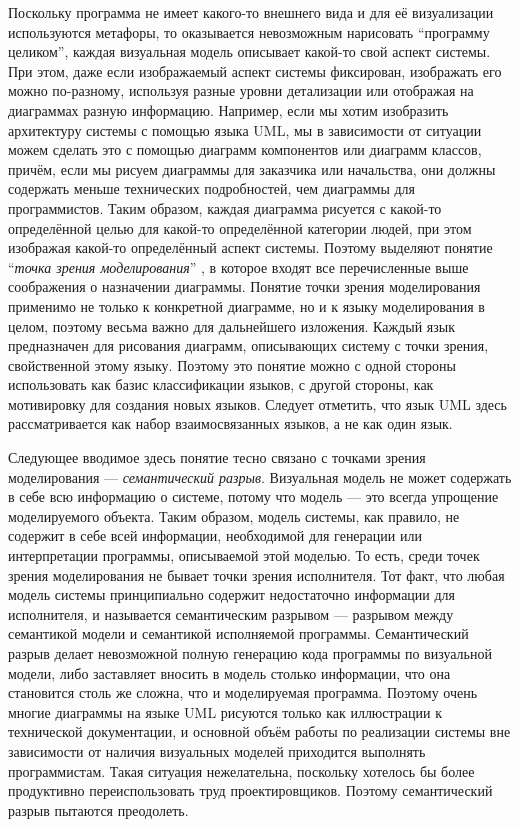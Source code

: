 Поскольку программа не имеет какого-то внешнего вида и для её визуализации 
используются метафоры, то оказывается невозможным нарисовать 
"`программу целиком"', каждая визуальная модель описывает какой-то свой аспект 
системы. При этом, даже если изображаемый аспект системы фиксирован, изображать 
его можно по-разному, используя разные уровни детализации или отображая на 
диаграммах разную информацию. Например, если мы хотим изобразить архитектуру 
системы с помощью языка \ac{UML}, мы в зависимости от ситуации можем сделать это с 
помощью диаграмм компонентов или диаграмм классов, причём, если мы рисуем 
диаграммы для заказчика или начальства, они должны содержать меньше технических 
подробностей, чем диаграммы для программистов. Таким образом, каждая диаграмма 
рисуется с какой-то определённой целью для какой-то определённой категории 
людей, при этом изображая какой-то определённый аспект системы. Поэтому выделяют 
понятие "`\textit{точка зрения моделирования}"'%
, в которое входят все перечисленные выше 
соображения о назначении диаграммы. Понятие точки зрения моделирования применимо 
не только к конкретной диаграмме, но и к языку моделирования в целом, поэтому 
весьма важно для дальнейшего изложения. Каждый язык предназначен для рисования 
диаграмм, описывающих систему с точки зрения, свойственной этому языку. 
Поэтому это понятие можно с одной стороны использовать как базис классификации 
языков, с другой стороны, как мотивировку для создания новых языков. Следует отметить, 
что язык \ac{UML} здесь рассматривается как набор взаимосвязанных 
языков, а не как один язык.

Следующее вводимое здесь понятие тесно связано с точками зрения моделирования 
--- \textit{семантический разрыв}. Визуальная модель не может содержать в себе всю 
информацию о системе, потому что модель --- это всегда упрощение моделируемого 
объекта. Таким образом, модель системы, как правило, не содержит в себе всей 
информации, необходимой для генерации или интерпретации программы, описываемой 
этой моделью. То есть, среди точек зрения моделирования не бывает точки зрения 
исполнителя. Тот факт, что любая модель системы принципиально содержит 
недостаточно информации для исполнителя, и называется семантическим разрывом ---
разрывом между семантикой модели и семантикой исполняемой программы. 
Семантический разрыв делает невозможной полную генерацию кода программы по 
визуальной модели, либо заставляет вносить в модель столько информации, что 
она становится столь же сложна, что и моделируемая программа. Поэтому очень 
многие диаграммы на языке \ac{UML} рисуются только как иллюстрации к технической 
документации, и основной объём работы по реализации системы вне зависимости от 
наличия визуальных моделей приходится выполнять программистам. Такая ситуация 
нежелательна, поскольку хотелось бы более продуктивно переиспользовать труд 
проектировщиков. Поэтому семантический разрыв пытаются преодолеть.

